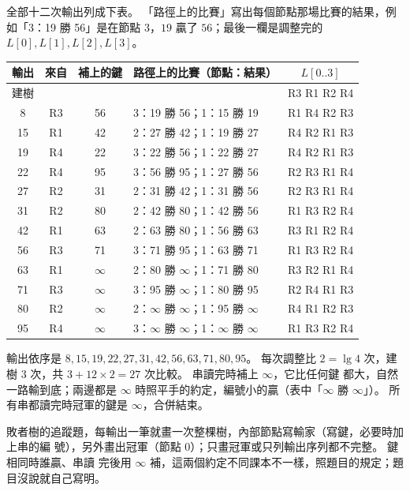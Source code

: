 全部十二次輸出列成下表。 「路徑上的比賽」寫出每個節點那場比賽的結果，例如「3：19
勝 56」是在節點 3，$19$ 贏了 $56$；最後一欄是調整完的 $L[0], L[1], L[2], L[3]$。

\begin{center}
\footnotesize
\begin{tabular}{ccclc}
\toprule
輸出 & 來自 & 補上的鍵 & 路徑上的比賽（節點：結果） & $L[0..3]$ \\
\midrule
\multicolumn{4}{l}{建樹} & R3 R1 R2 R4 \\
8 & R3 & 56 & 3：19 勝 56；1：15 勝 19 & R1 R4 R2 R3 \\
15 & R1 & 42 & 2：27 勝 42；1：19 勝 27 & R4 R2 R1 R3 \\
19 & R4 & 22 & 3：22 勝 56；1：22 勝 27 & R4 R2 R1 R3 \\
22 & R4 & 95 & 3：56 勝 95；1：27 勝 56 & R2 R3 R1 R4 \\
27 & R2 & 31 & 2：31 勝 42；1：31 勝 56 & R2 R3 R1 R4 \\
31 & R2 & 80 & 2：42 勝 80；1：42 勝 56 & R1 R3 R2 R4 \\
42 & R1 & 63 & 2：63 勝 80；1：56 勝 63 & R3 R1 R2 R4 \\
56 & R3 & 71 & 3：71 勝 95；1：63 勝 71 & R1 R3 R2 R4 \\
63 & R1 & $\infty$ & 2：80 勝 $\infty$；1：71 勝 80 & R3 R2 R1 R4 \\
71 & R3 & $\infty$ & 3：95 勝 $\infty$；1：80 勝 95 & R2 R4 R1 R3 \\
80 & R2 & $\infty$ & 2：$\infty$ 勝 $\infty$；1：95 勝 $\infty$ & R4 R1 R2 R3 \\
95 & R4 & $\infty$ & 3：$\infty$ 勝 $\infty$；1：$\infty$ 勝 $\infty$ & R1 R3 R2 R4 \\
\bottomrule
\end{tabular}
\end{center}

輸出依序是 $8, 15, 19, 22, 27, 31, 42, 56, 63, 71, 80, 95$。 每次調整比 $2 = \lg 4$
次，建樹 $3$ 次，共 $3 + 12 \times 2 = 27$ 次比較。 串讀完時補上 $\infty$，它比任何鍵
都大，自然一路輸到底；兩邊都是 $\infty$ 時照平手的約定，編號小的贏（表中「$\infty$ 勝
$\infty$」）。 所有串都讀完時冠軍的鍵是 $\infty$，合併結束。

\begin{examnote}
敗者樹的追蹤題，每輸出一筆就畫一次整棵樹，內部節點寫輸家（寫鍵，必要時加上串的編
號），另外畫出冠軍（節點 $0$）；只畫冠軍或只列輸出序列都不完整。 鍵相同時誰贏、串讀
完後用 $\infty$ 補，這兩個約定不同課本不一樣，照題目的規定；題目沒說就自己寫明。
\end{examnote}

